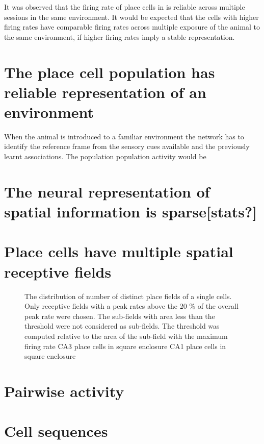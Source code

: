 It was observed that the firing rate of place cells in is reliable across multiple sessions in the same environment. It would be expected that the cells with higher firing rates have comparable firing rates across multiple exposure of the animal to the same environment, if higher firing rates imply a stable representation. 

\section{The place cell population has reliable representation of an environment}
When the animal is introduced to a familiar environment the network has to identify the reference frame from the sensory cues available and the previously learnt associations. The population population activity would be  

\section{The neural representation of spatial information is sparse[stats?]}

\section{Place cells have multiple spatial receptive fields}
\begin{figure}[htb!]
\label{fig:nsubfields}
\caption[Multiple fields of Place Cells]{The distribution of number of distinct place fields of a single cells. Only receptive fields with a peak rates above the 20 \% of the overall peak rate were chosen. The sub-fields with area less than the threshold were not considered as sub-fields. The threshold was computed relative to the area of the sub-field with the maximum firing rate  CA3 place cells in square enclosure  CA1 place cells in square enclosure}
\end{figure}
\section{Pairwise activity}

\section{Cell sequences}

\section{}


